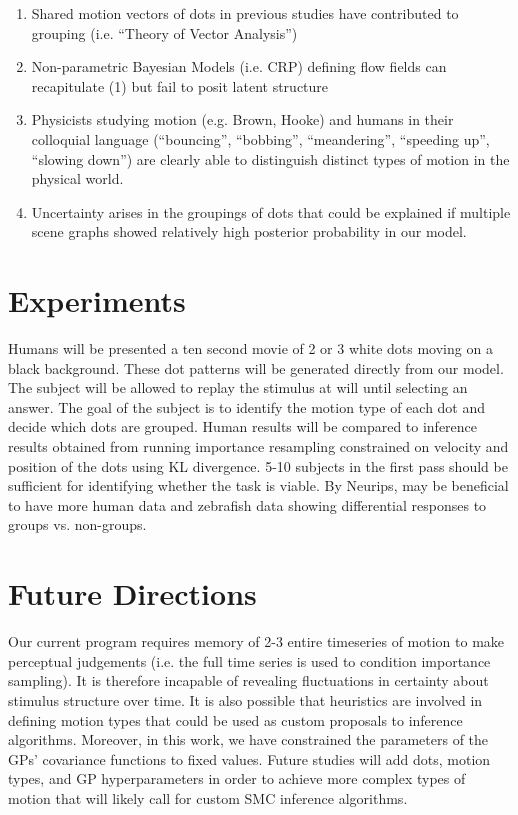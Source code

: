 \documentclass{scrartcl}
\begin{document}
\begin{enumerate}
  \item Shared motion vectors of dots in previous studies have contributed to grouping (i.e. ``Theory of Vector Analysis'') \cite{Johansson_1973}
  \item Non-parametric Bayesian Models (i.e. CRP) defining flow fields can recapitulate (1) but fail to posit latent structure \cite{Gershman_2016}
  \item Physicists studying motion (e.g. Brown, Hooke) and humans in their colloquial language (``bouncing'', ``bobbing'', ``meandering'', ``speeding up'', ``slowing down'') are clearly able to distinguish distinct types of motion in the physical world. 
  \item Uncertainty arises in the groupings of dots that could be explained if multiple scene graphs showed relatively high posterior probability in our model. 
\end{enumerate}

\section*{Experiments}

Humans will be presented a ten second movie of 2 or 3 white dots moving on a black background. These dot patterns will be generated directly from our model. The subject will be allowed to replay the stimulus at will until selecting an answer. The goal of the subject is to identify the motion type of each dot and decide which dots are grouped. Human results will be compared to inference results obtained from running importance resampling constrained on velocity and position of the dots using KL divergence. 5-10 subjects in the first pass should be sufficient for identifying whether the task is viable. By Neurips, may be beneficial to have more human data and zebrafish data showing differential responses to groups vs. non-groups. 

\section*{Future Directions}

Our current program requires memory of 2-3 entire timeseries of motion to make perceptual judgements (i.e. the full time series is used to condition importance sampling). It is therefore incapable of revealing fluctuations in certainty about stimulus structure over time. It is also possible that heuristics are involved in defining motion types that could be used as custom proposals to inference algorithms. Moreover, in this work, we have constrained the parameters of the GPs' covariance functions to fixed values. Future studies will add dots, motion types, and GP hyperparameters in order to achieve more complex types of motion that will likely call for custom SMC inference algorithms. 



\end{document}
